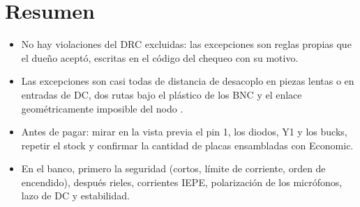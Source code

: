 \section*{Resumen}
\begin{itemize}
  \item No hay violaciones del DRC excluidas: las excepciones son reglas propias que el dueño aceptó, escritas en el
  código del chequeo con su motivo.
  \item Las excepciones son casi todas de distancia de desacoplo en piezas lentas o en entradas de DC, dos rutas bajo
  el plástico de los BNC y el enlace geométricamente imposible del nodo .
  \item Antes de pagar: mirar en la vista previa el pin 1, los diodos, Y1 y los bucks, repetir el stock y confirmar la
  cantidad de placas ensambladas con Economic.
  \item En el banco, primero la seguridad (cortos, límite de corriente, orden de encendido), después rieles, corrientes
  IEPE, polarización de los micrófonos, lazo de DC y estabilidad.
\end{itemize}

